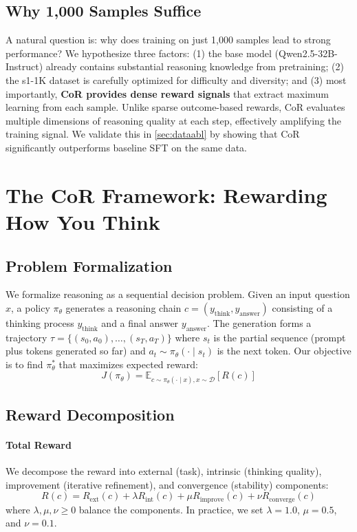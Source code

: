 \documentclass{article}
\theoremstyle{plain}
\theoremstyle{definition}
\theoremstyle{remark}
\begin{document}
\subsection{Why 1,000 Samples Suffice}
\label{sec:why1k}

A natural question is: why does training on just 1,000 samples lead to strong performance? We hypothesize three factors: (1) the base model (Qwen2.5-32B-Instruct) already contains substantial reasoning knowledge from pretraining; (2) the s1-1K dataset is carefully optimized for difficulty and diversity; and (3) most importantly, \textbf{CoR provides dense reward signals} that extract maximum learning from each sample. Unlike sparse outcome-based rewards, CoR evaluates multiple dimensions of reasoning quality at each step, effectively amplifying the training signal. We validate this in \autoref{sec:dataabl} by showing that CoR significantly outperforms baseline SFT on the same data.

\FloatBarrier

\section{The CoR Framework: Rewarding How You Think}
\label{sec:method}

\subsection{Problem Formalization}

We formalize reasoning as a sequential decision problem. Given an input question $x$, a policy $\pi_\theta$ generates a reasoning chain $c = (y_{\text{think}}, y_{\text{answer}})$ consisting of a thinking process $y_{\text{think}}$ and a final answer $y_{\text{answer}}$. The generation forms a trajectory $\tau = \{(s_0, a_0), \ldots, (s_T, a_T)\}$ where $s_t$ is the partial sequence (prompt plus tokens generated so far) and $a_t \sim \pi_\theta(\cdot \mid s_t)$ is the next token. Our objective is to find $\pi_\theta^*$ that maximizes expected reward:
\begin{equation}
J(\pi_\theta) = \mathbb{E}_{c \sim \pi_\theta(\cdot \mid x), x \sim \mathcal{D}} [R(c)]
\end{equation}

\subsection{Reward Decomposition}

\paragraph{Total Reward} We decompose the reward into external (task), intrinsic (thinking quality), improvement (iterative refinement), and convergence (stability) components:
\begin{equation}
R(c) = R_{\text{ext}}(c) + \lambda R_{\text{int}}(c) + \mu R_{\text{improve}}(c) + \nu R_{\text{converge}}(c)
\end{equation}
where $\lambda, \mu, \nu \geq 0$ balance the components. In practice, we set $\lambda = 1.0$, $\mu = 0.5$, and $\nu = 0.1$.
\end{document}
